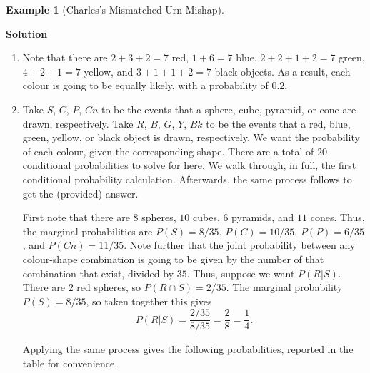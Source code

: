 \documentclass[
  letterpaper,
  DIV=11,
  numbers=noendperiod]{scrreprt}
\theoremstyle{definition}
\theoremstyle{definition}
\newtheorem{example}{Example}[chapter]
\theoremstyle{definition}
\theoremstyle{remark}
\begin{document}
\begin{example}[Charles's Mismatched Urn
Mishap]
\begin{tcolorbox}[enhanced jigsaw, colback=white, colframe=quarto-callout-color-frame, arc=.35mm, leftrule=.75mm, rightrule=.15mm, opacityback=0, breakable, bottomrule=.15mm, left=2mm, toprule=.15mm]

\vspace{-3mm}\textbf{Solution}\vspace{3mm}

\begin{enumerate}
\def\labelenumi{\alph{enumi}.}
\item
  Note that there are \(2+3+2=7\) red, \(1+6=7\) blue, \(2+2+1+2=7\)
  green, \(4+2+1=7\) yellow, and \(3+1+1+2=7\) black objects. As a
  result, each colour is going to be equally likely, with a probability
  of \(0.2\).
\item
  Take \(S\), \(C\), \(P\), \(Cn\) to be the events that a sphere, cube,
  pyramid, or cone are drawn, respectively. Take \(R\), \(B\), \(G\),
  \(Y\), \(Bk\) to be the events that a red, blue, green, yellow, or
  black object is drawn, respectively. We want the probability of each
  colour, given the corresponding shape. There are a total of \(20\)
  conditional probabilities to solve for here. We walk through, in full,
  the first conditional probability calculation. Afterwards, the same
  process follows to get the (provided) answer.

  First note that there are \(8\) spheres, \(10\) cubes, \(6\) pyramids,
  and \(11\) cones. Thus, the marginal probabilities are
  \(P(S) = 8/35\), \(P(C) = 10/35\), \(P(P) = 6/35\), and
  \(P(Cn) = 11/35\). Note further that the joint probability between any
  colour-shape combination is going to be given by the number of that
  combination that exist, divided by \(35\). Thus, suppose we want
  \(P(R|S)\). There are \(2\) red spheres, so \(P(R \cap S) = 2/35\).
  The marginal probability \(P(S) = 8/35\), so taken together this gives
  \[P(R|S) = \frac{2/35}{8/35} = \frac{2}{8} = \frac{1}{4}.\]

  Applying the same process gives the following probabilities, reported
  in the table for convenience.


\end{enumerate}
\end{tcolorbox}
\end{example}
\end{document}
